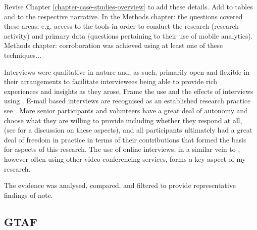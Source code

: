 Revise Chapter \ref{chapter-case-studies-overview} to add these details. Add to tables and to the respective narrative. In the Methods chapter: the questions covered these areas: e.g. access to the tools in order to conduct the research (research activity) and primary data (questions pertaining to their use  of mobile analytics). Methods chapter: corroboration was achieved using at least one of these techniques...

Interviews were qualitative in nature and, as such, primarily open and flexible in their arrangements to facilitate interviewees being able to provide rich experiences and insights as they arose. Frame the use and the effects of interviews using . E-mail based interviews are recognised as an established research practice see . More senior participants and volunteers have a great deal of autonomy and choose what they are willing to provide including whether they respond at all, (see  for a discussion on these aspects), and all participants ultimately had a great deal of freedom in practice in terms of their contributions that formed the basis for aspects of this research. The use of online interviews, in a similar vein to , however often using other video-conferencing services, forms a key aspect of my research.

The evidence was analysed, compared, and filtered to provide representative findings of note. 

\subsection{GTAF}

